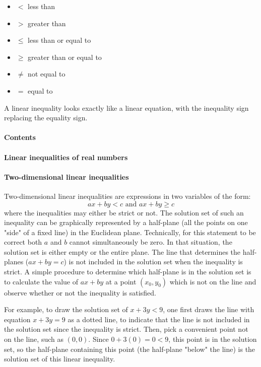 \begin{itemize}
    \item $<$ less than
    \item $>$ greater than
    \item $\leq$ less than or equal to
    \item $\geq$ greater than or equal to
    \item $\neq$ not equal to
    \item $=$ equal to
\end{itemize}

A linear inequality looks exactly like a linear equation, with the inequality sign replacing the equality sign.

\paragraph{Contents}

\paragraph{Linear inequalities of real numbers}

\paragraph{Two-dimensional linear inequalities}

Two-dimensional linear inequalities are expressions in two variables of the form:
$$
a x + b y < c \text{ and } a x + b y \geq c
$$
where the inequalities may either be strict or not. The solution set of such an inequality can be graphically represented by a half-plane (all the points on one "side" of a fixed line) in the Euclidean plane. Technically, for this statement to be correct both $a$ and $b$ cannot simultaneously be zero. In that situation, the solution set is either empty or the entire plane. The line that determines the half-planes ($a x + b y = c$) is not included in the solution set when the inequality is strict. A simple procedure to determine which half-plane is in the solution set is to calculate the value of $a x + b y$ at a point $(x_0, y_0)$ which is not on the line and observe whether or not the inequality is satisfied.

For example, to draw the solution set of $x + 3y < 9$, one first draws the line with equation $x + 3y = 9$ as a dotted line, to indicate that the line is not included in the solution set since the inequality is strict. Then, pick a convenient point not on the line, such as $(0,0)$. Since $0 + 3(0) = 0 < 9$, this point is in the solution set, so the half-plane containing this point (the half-plane "below" the line) is the solution set of this linear inequality.

